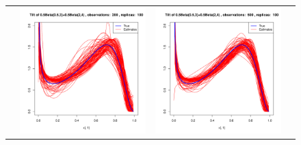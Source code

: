 \documentclass[10pt]{report}
\begin{document}
\begin{figure}[h]
\begin{tabular}{cccc}
	&
	\includegraphics[width=\textwidth/4]{../img/p05_a05_b3_p05_a2_b4/tilted/K2/densities/n200_R100.pdf}
	&
	\includegraphics[width=\textwidth/4]{../img/p05_a05_b3_p05_a2_b4/tilted/K2/densities/n500_R100.pdf}\\
	

\end{tabular}
\end{figure}
\end{document}
